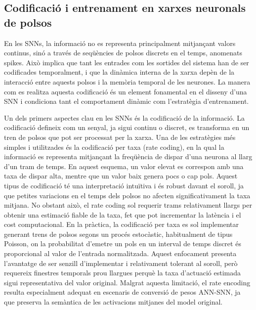 \documentclass[a4paper,11pt, titlepage, twoside]{article}
\begin{document}
\subsection{Codificació i entrenament en xarxes neuronals de polsos}

En les SNNs, la informació no es representa principalment mitjançant valors continus, sinó a través de seqüències de polsos discrets en el temps, anomenats spikes. Això implica que tant les entrades com les sortides del sistema han de ser codificades temporalment, i que la dinàmica interna de la xarxa depèn de la interacció entre aquests polsos i la memòria temporal de les neurones. La manera com es realitza aquesta codificació és un element fonamental en el disseny d'una SNN i condiciona tant el comportament dinàmic com l'estratègia d'entrenament.

Un dels primers aspectes clau en les SNNs és la codificació de la informació. La codificació defineix com un senyal, ja sigui continu o discret, es transforma en un tren de polsos que pot ser processat per la xarxa. Una de les estratègies més simples i utilitzades és la codificació per taxa (rate coding), en la qual la informació es representa mitjançant la freqüència de dispar d'una neurona al llarg d'un tram de temps. En aquest esquema, un valor elevat es correspon amb una taxa de dispar alta, mentre que un valor baix genera pocs o cap pols. Aquest tipus de codificació té una interpretació intuïtiva i és robust davant el soroll, ja que petites variacions en el temps dels polsos no afecten significativament la taxa mitjana. No obstant això, el rate coding sol requerir trams relativament llargs per obtenir una estimació fiable de la taxa, fet que pot incrementar la latència i el cost computacional.
En la pràctica, la codificació per taxa es sol implementar generant trens de polsos segons un procés estocàstic, habitualment de tipus Poisson, on la probabilitat d'emetre un pols en un interval de temps discret és proporcional al valor de l'entrada normalitzada. Aquest enfocament presenta l'avantatge de ser senzill d'implementar i relativament tolerant al soroll, però requereix finestres temporals prou llargues perquè la taxa d'actuació estimada sigui representativa del valor original. Malgrat aquesta limitació, el rate encoding resulta especialment adequat en escenaris de conversió de pesos ANN-SNN, ja que preserva la semàntica de les activacions mitjanes del model original.
\end{document}

